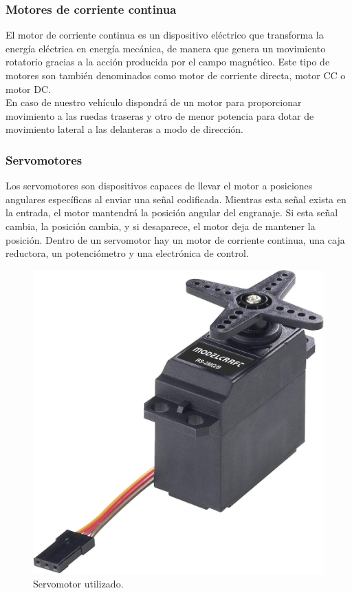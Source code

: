 \subsubsection{Motores de corriente continua}

El motor de corriente continua es un dispositivo eléctrico que transforma la energía eléctrica en energía mecánica, de manera que genera un movimiento rotatorio gracias a la  
acción producida por el campo magnético. Este tipo de motores son también denominados como motor de corriente directa, motor CC o motor DC.\\

En caso de nuestro vehículo dispondrá de un motor para proporcionar movimiento a las ruedas traseras y otro de menor potencia para dotar de movimiento lateral a las delanteras a modo de dirección.

\subsubsection{Servomotores}

Los servomotores son dispositivos capaces de llevar el motor a posiciones angulares específicas al enviar una señal codificada. Mientras esta señal exista en la entrada, 
el  motor  mantendrá  la  posición  angular  del  engranaje. Si esta señal cambia, la posición cambia, y si desaparece, el motor deja de mantener la posición. Dentro de un servomotor hay un motor de corriente
continua, una caja reductora, un potenciómetro y una electrónica de control.\\

\begin{figure}[H]
  \begin{center}
    \includegraphics[scale=0.1]{imagenes/servo.jpg}
  \end{center}
  \caption{Servomotor utilizado.}
  \label{figure:servomotor:}
\end{figure}

